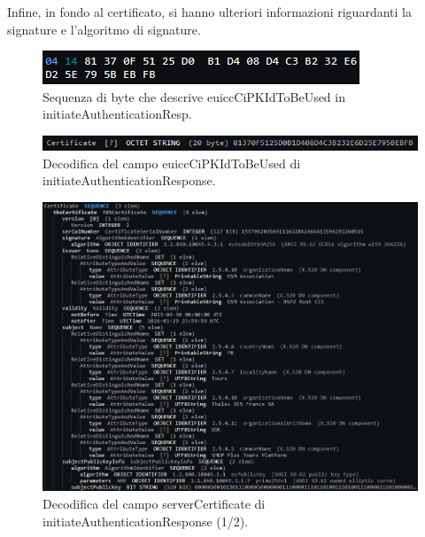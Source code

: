 \documentclass[10pt, oneside]{book}
\begin{document}
Infine, in fondo al certificato, si hanno ulteriori informazioni riguardanti la signature e l'algoritmo di signature.
\begin{figure}
\includegraphics[width=\linewidth]{asn1-euiccCiPKIdToBeUsed.png}
\caption{Sequenza di byte che descrive euiccCiPKIdToBeUsed in initiateAuthenticationResp.}
\label{fig:asn1-euiccCiPKIdToBeUsed}
\end{figure}
\begin{figure}
\includegraphics[width=\linewidth]{decode-euiccCiPKIdToBeUsed.png}
\caption{Decodifica del campo euiccCiPKIdToBeUsed di initiateAuthenticationResponse.}
\label{fig:decode-euiccCiPKIdToBeUsed}
\end{figure}
\begin{figure}
\includegraphics[width=\linewidth]{decode-serverCertificate1.png}
\caption{Decodifica del campo serverCertificate di initiateAuthenticationResponse (1/2).}
\label{fig:decode-serverCertificate1}
\end{figure}
\end{document}
